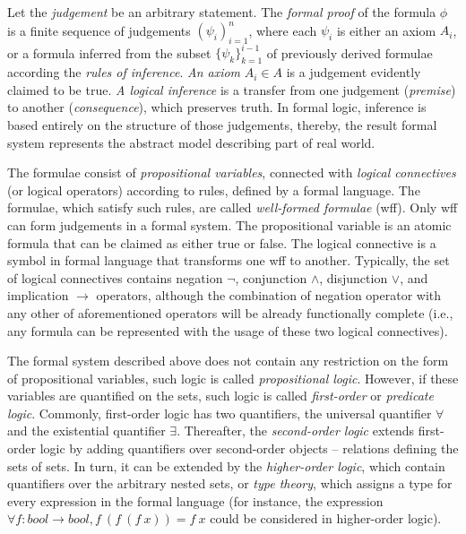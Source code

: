 \documentclass[article]{aaltoseries}
\begin{document}
Let the \textit{judgement} be an arbitrary statement. The \textit{formal proof} of the formula $\phi$ is a finite sequence of judgements $ ( \psi_i )_{i=1}^{n} $, where each $\psi_i$ is either an axiom $A_i$, or a formula inferred from the subset $\{ \psi_k \}_{k=1}^{i-1}$ of previously derived formulae according the \textit{rules of inference}. \textit{An axiom} $A_i \in A$ is a judgement evidently claimed to be true. \textit{A logical inference} is a transfer from one judgement (\textit{premise}) to another (\textit{consequence}), which preserves truth. In formal logic, inference is based entirely on the structure of those judgements, thereby, the result formal system represents the abstract model describing part of real world.

The formulae consist of \textit{propositional variables}, connected with \textit{logical connectives} (or logical operators) according to rules, defined by a formal language. The formulae, which satisfy such rules, are called \textit{well-formed formulae} (wff). Only wff can form judgements in a formal system. The propositional variable is an atomic formula that can be claimed as either true or false. The logical connective is a symbol in formal language that transforms one wff to another. Typically, the set of logical connectives contains negation $\neg$, conjunction $\land$, disjunction $\lor$, and implication $\rightarrow$ operators, although the combination of negation operator with any other of aforementioned operators will be already functionally complete (i.e., any formula can be represented with the usage of these two logical connectives).

The formal system described above does not contain any restriction on the form of propositional variables, such logic is called \textit{propositional logic}. However, if these variables are quantified on the sets, such logic is called \textit{first-order} or \textit{predicate logic}. Commonly, first-order logic has two quantifiers, the universal quantifier $\forall$ and the existential quantifier $\exists$. Thereafter, the \textit{second-order logic} extends first-order logic by adding quantifiers over second-order objects -- relations defining the sets of sets. In turn, it can be extended by the \textit{higher-order logic}, which contain quantifiers over the arbitrary nested sets, or \textit{type theory}, which assigns a type for every expression in the formal language (for instance, the expression $\forall f: bool \rightarrow bool, f\ (f\ (f\ x)) = f\ x$ could be considered in higher-order logic).
\end{document}
